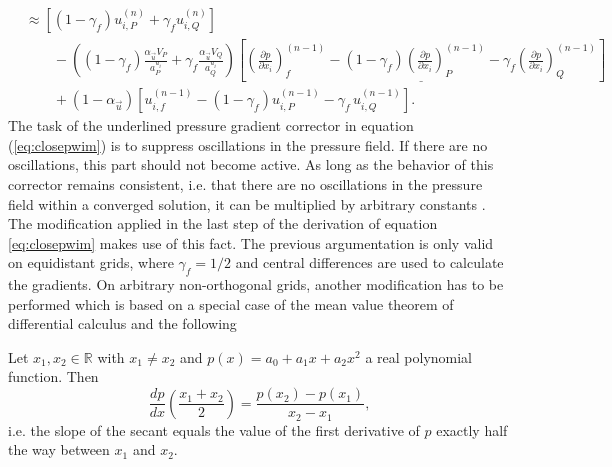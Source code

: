 \begin{align}
  &\approx
  \left[\left(1 - \gamma_f\right) u_{i,P}^{(n)} + \gamma_f u_{i,Q}^{(n)} \right] \nonumber\\[1em]
  &\quad\quad - 
  \left(\left(1 - \gamma_f\right) \frac{\alpha_\vec{u} V_P}{a_P^{u_i}} + \gamma_f \frac{\alpha_\vec{u} V_Q}{a_Q^{u_i}}\right)
  \left[ 
    \underline{\left(\frac{\partial p}{\partial x_i}\right)_f^{(n-1)} 
  - \left(1 - \gamma_f \right) \left( \frac{\partial p}{\partial x_i} \right)_P^{(n-1)} 
- \gamma_f \left(\frac{\partial p}{\partial x_i}\right)_Q^{(n-1)}}
  \right] \nonumber \\[1em]
  &\quad\quad + \left(1 - \alpha_\vec{u}\right) \left[ u_{i,f}^{(n-1)} - \left(1 - \gamma_f\right) u_{i,P}^{(n-1)} - \gamma_f \, u_{i,Q}^{(n-1)} \right].
\end{align}
\endgroup
The task of the underlined pressure gradient corrector in equation (\ref{eq:closepwim}) is to suppress oscillations in the pressure field. If there are no oscillations, this part should not become active. As long as the behavior of this corrector remains consistent, i.e. that there are no oscillations in the pressure field within a converged solution, it can be multiplied by arbitrary constants \cite{ferziger02}. The modification applied in the last step of the derivation of equation \ref{eq:closepwim} makes use of this fact. The previous argumentation is only valid on equidistant grids, where \(\gamma_f = 1/2\) and central differences are used to calculate the gradients. On arbitrary non-orthogonal grids, another modification has to be performed which is based on a special case of the mean value theorem of differential calculus and the following 
\begin{prop}
  Let \(x_1,x_2 \in \mathbb{R}\) with \(x_1 \neq x_2\) and \(p(x) = a_0 + a_1 x + a_2 x^2\) a real polynomial function. Then 
  \begin{displaymath}
    \frac{dp}{dx}\left(\frac{x_1+x_2}{2}\right) = \frac{p(x_2) - p(x_1)}{x_2 - x_1},
  \end{displaymath}
  i.e. the slope of the secant equals the value of the first derivative of \(p\) exactly half the way between \(x_1\) and \(x_2\).
\end{prop}

